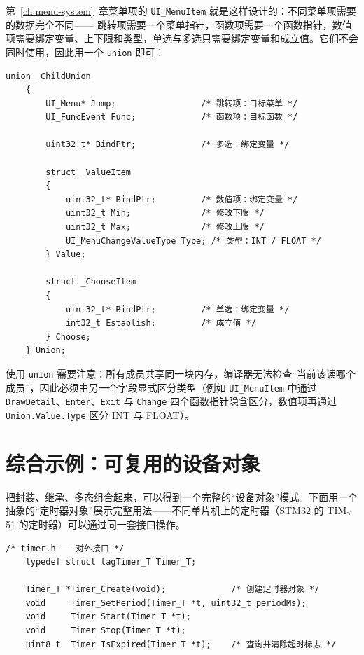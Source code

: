 第~\ref{ch:menu-system}~章菜单项的 \texttt{UI\_MenuItem} 就是这样设计的：不同菜单项需要的数据完全不同—— 跳转项需要一个菜单指针，函数项需要一个函数指针，数值项需要绑定变量、上下限和类型，单选与多选只需要绑定变量和成立值。它们不会同时使用，因此用一个 \texttt{union} 即可：

\begin{lstlisting}[style=c]
	union _ChildUnion
	{
		UI_Menu* Jump;                 /* 跳转项：目标菜单 */
		UI_FuncEvent Func;             /* 函数项：目标函数 */
		
		uint32_t* BindPtr;             /* 多选：绑定变量 */
		
		struct _ValueItem
		{
			uint32_t* BindPtr;         /* 数值项：绑定变量 */
			uint32_t Min;              /* 修改下限 */
			uint32_t Max;              /* 修改上限 */
			UI_MenuChangeValueType Type; /* 类型：INT / FLOAT */
		} Value;
		
		struct _ChooseItem
		{
			uint32_t* BindPtr;         /* 单选：绑定变量 */
			int32_t Establish;         /* 成立值 */
		} Choose;
	} Union;
\end{lstlisting}

使用 \texttt{union} 需要注意：所有成员共享同一块内存，编译器无法检查“当前该读哪个成员”，因此必须由另一个字段显式区分类型（例如 \texttt{UI\_MenuItem} 中通过 \texttt{DrawDetail}、\texttt{Enter}、\texttt{Exit} 与 \texttt{Change} 四个函数指针隐含区分，数值项再通过 \texttt{Union.Value.Type} 区分 INT 与 FLOAT）。

\section{综合示例：可复用的设备对象}

把封装、继承、多态组合起来，可以得到一个完整的“设备对象”模式。下面用一个抽象的“定时器对象”展示完整用法——不同单片机上的定时器（STM32 的 TIM、51 的定时器）可以通过同一套接口操作。

\begin{lstlisting}[style=c]
	/* timer.h —— 对外接口 */
	typedef struct tagTimer_T Timer_T;
	
	Timer_T *Timer_Create(void);             /* 创建定时器对象 */
	void     Timer_SetPeriod(Timer_T *t, uint32_t periodMs);
	void     Timer_Start(Timer_T *t);
	void     Timer_Stop(Timer_T *t);
	uint8_t  Timer_IsExpired(Timer_T *t);    /* 查询并清除超时标志 */
\end{lstlisting}

